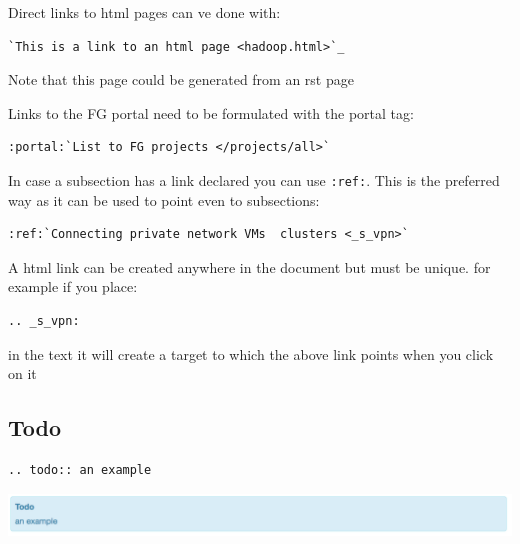 Direct links to html pages can ve done with:

\begin{verbatim}
`This is a link to an html page <hadoop.html>`_
\end{verbatim}

Note that this page could be generated from an rst page

Links to the FG portal need to be formulated with the portal tag:

\begin{verbatim}
:portal:`List to FG projects </projects/all>`
\end{verbatim}

In case a subsection has a link declared you can use \verb|:ref:|. This is the
preferred way as it can be used to point even to subsections:

\begin{verbatim}
:ref:`Connecting private network VMs  clusters <_s_vpn>` 
\end{verbatim}

A html link can be created anywhere in the document but must be unique.
for example if you place:

\begin{verbatim}
.. _s_vpn:
\end{verbatim}

in the text it will create a target to which the above link points when
you click on it

\subsection{Todo}\label{todo}

\begin{verbatim}
.. todo:: an example
\end{verbatim}

\includegraphics[width=\columnwidth]{images/todo.png}
